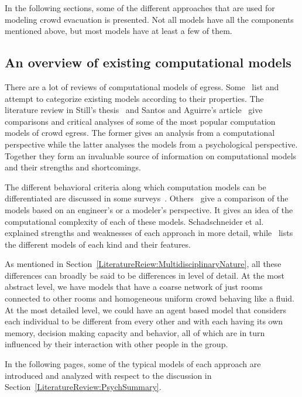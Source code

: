 In the following sections, some of the different approaches that are used for modeling crowd evacuation is presented. Not all models have all the components mentioned above, but most models have at least a few of them.

\subsection{An overview of existing computational models}
\label{LiteratureReview:ExistingModelsSummary}

There are a lot of reviews of computational models of egress. Some~\cite{WattsJr:1987tx,Gwynne:1999vi,Kuligowski:2005tt,Schadschneider:2008cz,Zheng:2009id} list and attempt to categorize existing models according to their properties. The literature review in Still's thesis~\cite{Still:2000tp} and Santos and Aguirre's article~\cite{Aguirre:2004tn} give comparisons and critical analyses of some of the most popular computation models of crowd egress. The former gives an analysis from a computational perspective while the latter analyses the models from a psychological perspective. Together they form an invaluable source of information on computational models and their strengths and shortcomings.

The different behavioral criteria along which computation models can be differentiated are discussed in some surveys~\cite{Gwynne:1999vi,Kuligowski:2005tt}. Others~\cite{Schadschneider:2008cz,Zheng:2009id} give a comparison of the models based on an engineer's or a modeler's perspective. It gives an idea of the computational complexity of each of these models. Schadschneider et al.~\cite{Schadschneider:2008cz} explained strengths and weaknesses of each approach in more detail, while~\cite{Zheng:2009id} lists the different models of each kind and their features.

As mentioned in Section~\ref{LiteratureReiew:MultidisciplinaryNature}, all these differences can broadly be said to be differences in level of detail. At the most abstract level, we have models that have a coarse network of just rooms connected to other rooms and homogeneous uniform crowd behaving like a fluid. At the most detailed level, we could have an agent based model that considers each individual to be different from every other and with each having its own memory, decision making capacity and behavior, all of which are in turn influenced by their interaction with other people in the group.

In the following pages, some of the typical models of each approach are introduced and analyzed with respect to the discussion in Section~\ref{LiteratureReview:PsychSummary}.


